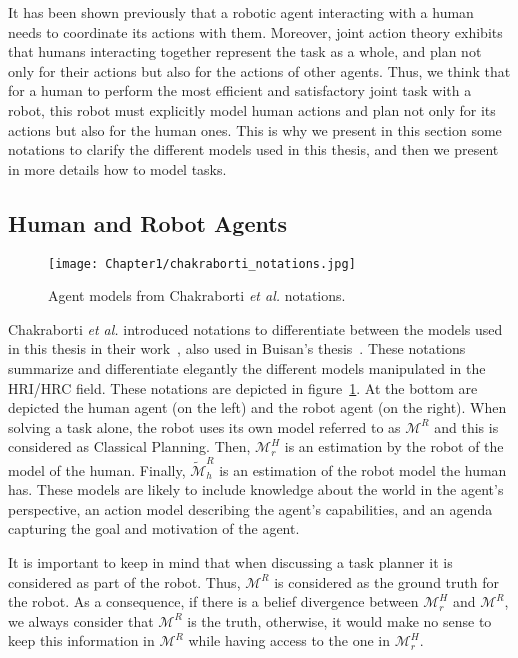 It has been shown previously that a robotic agent interacting with a human needs to coordinate its actions with them. Moreover, joint action theory exhibits that humans interacting together represent the task as a whole, and plan not only for their actions but also for the actions of other agents. Thus, we think that for a human to perform the most efficient and satisfactory joint task with a robot, this robot must explicitly model human actions and plan not only for its actions but also for the human ones. This is why we present in this section some notations to clarify the different models used in this thesis, and then we present in more details how to model tasks.

\subsection{Human and Robot Agents}

\begin{figure}
    \centering
    \texttt{[image: Chapter1/chakraborti\_notations.jpg]}
    \caption{Agent models from Chakraborti \textit{et al.} notations.}
    \label{fig:chakraborti_notations}
\end{figure}

Chakraborti \textit{et al.} introduced notations to differentiate between the models used in this thesis in their work~\cite{ChakrabortiBTZS15}, also used in Buisan's thesis~\cite{thesisBuisan21}. These notations summarize and differentiate elegantly the different models manipulated in the HRI/HRC field. These notations are depicted in figure~\ref{fig:chakraborti_notations}. At the bottom are depicted the human agent (on the left) and the robot agent (on the right). When solving a task alone, the robot uses its own model referred to as $\mathcal{M}^R$ and this is considered as Classical Planning. 
Then, $\mathcal{M}^H_r$ is an estimation by the robot of the model of the human. Finally, $\tilde{\mathcal{M}}^R_h$ is an estimation of the robot model the human has. These models are likely to include knowledge about the world in the agent's perspective, an action model describing the agent's capabilities, and an agenda capturing the goal and motivation of the agent.

It is important to keep in mind that when discussing a task planner it is considered as part of the robot. Thus, $\mathcal{M}^R$ is considered as the ground truth for the robot. As a consequence, if there is a belief divergence between $\mathcal{M}^H_r$ and $\mathcal{M}^R$, we always consider that $\mathcal{M}^R$ is the truth, otherwise, it would make no sense to keep this information in $\mathcal{M}^R$ while having access to the one in $\mathcal{M}^H_r$.


